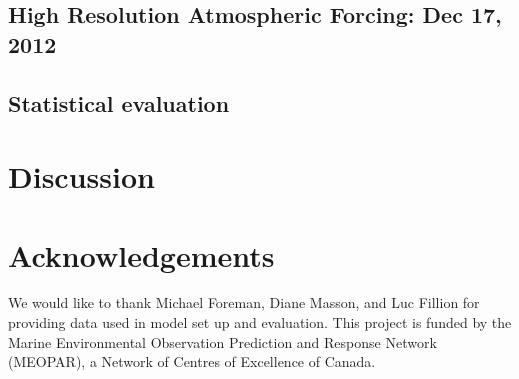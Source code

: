 \documentclass[pdftex,10pt]{article}
\begin{document}
\subsection{High Resolution Atmospheric Forcing: Dec 17, 2012}

\subsection{Statistical evaluation}

\section{Discussion}\label{sec:diss}

\section{Acknowledgements}\label{sec:ack}
We would like to thank Michael Foreman, Diane Masson, and Luc Fillion for providing data used in model set up and evaluation. This project is funded by the Marine Environmental Observation Prediction and Response Network (MEOPAR), a Network of Centres of Excellence of Canada.  



\end{document}
